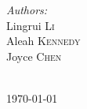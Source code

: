 \documentclass{article}
\begin{document}
\begin{titlepage}
\begin{minipage}{0.4\textwidth}
\begin{flushleft} \large
\emph{Authors:}\\
Lingrui \textsc{Li}\\ 
Aleah \textsc{Kennedy}\\
Joyce \textsc{Chen}\\ 
\end{flushleft}

\end{minipage}\\[2cm]



{\large \today}\\[2cm] %

\vfill %

\end{titlepage}
\end{document}

